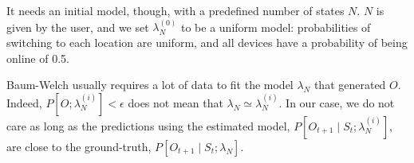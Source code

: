 It needs an initial model, though, with a predefined number of states $N$. 
$N$ is given by the user, and we set $\lambda_{N}^{(0)}$ to be a uniform model: probabilities of switching to each location are uniform, and all devices have a probability of being online of 0.5.

Baum-Welch usually requires a lot of data to fit the model $\lambda_N$ that generated $O$.
Indeed, $P[O; \lambda_{N}^{(i)}] < \epsilon$ does not mean that $\lambda_N \simeq \lambda_N^{(i)}$.
In our case, we do not care as long as the predictions using the estimated model, $P[O_{t+1} \mid S_t; \lambda_N^{(i)}]$, are close to the ground-truth, $P[O_{t+1} \mid S_t; \lambda_N]$.
